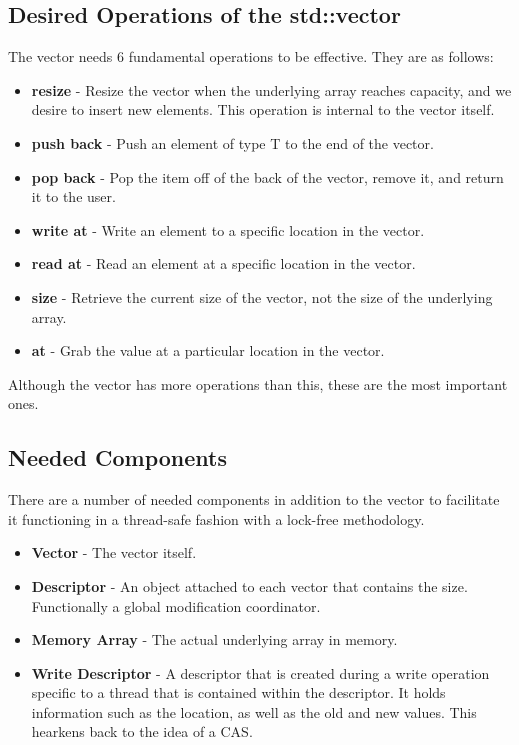 \documentclass{article}
\begin{document}
\subsection*{Desired Operations of the std::vector}
The vector needs 6 fundamental operations to be effective. They are as follows:
\begin{itemize}
    \item \textbf{resize} - Resize the vector when the underlying array reaches capacity, and we desire to insert new elements. This operation is internal to the vector itself.
    \item \textbf{push back} - Push an element of type T to the end of the vector.
    \item \textbf{pop back} - Pop the item off of the back of the vector, remove it, and return it to the user.
    \item \textbf{write at} - Write an element to a specific location in the vector.
    \item \textbf{read at} - Read an element at a specific location in the vector.
    \item \textbf{size} - Retrieve the current size of the vector, not the size of the underlying array.
    \item \textbf{at} - Grab the value at a particular location in the vector.
\end{itemize}
Although the vector has more operations than this, these are the most important ones.

\subsection*{Needed Components}
There are a number of needed components in addition to the vector to facilitate it functioning in a thread-safe fashion with a lock-free methodology.
\begin{itemize}
    \item \textbf{Vector} - The vector itself.
    \item \textbf{Descriptor} - An object attached to each vector that contains the size. Functionally a global modification coordinator.
    \item \textbf{Memory Array} - The actual underlying array in memory.
    \item \textbf{Write Descriptor} - A descriptor that is created during a write operation specific to a thread that is contained within the descriptor. It holds information such as the location, as well as the old and new values. This hearkens back to the idea of a CAS.
\end{itemize}
\end{document}
